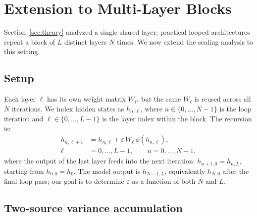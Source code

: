 \section{Extension to Multi-Layer Blocks}
\label{sec:multilayer}





Section~\ref{sec:theory} analyzed a single shared layer; practical looped architectures repeat a block of $L$ distinct layers $N$ times.
We now extend the scaling analysis to this setting.

\subsection{Setup}

Each layer $\ell$ has its own weight matrix $W_\ell$, but the same $W_\ell$ is reused across all $N$ iterations.
We index hidden states as $h_{n,\ell}$, where $n\in\{0,\dots,N-1\}$ is the loop iteration and $\ell\in\{0,\dots,L-1\}$ is the layer index within the block.
The recursion is:
\begin{equation}
  \begin{aligned}
  h_{n,\ell+1}
  &= h_{n,\ell}+\varepsilon\, W_\ell\,\phi(h_{n,\ell}),\\
  \ell&=0,\dots,L-1,\qquad n=0,\dots,N-1,
  \end{aligned}
  \label{eq:Llayer-recursion}
\end{equation}
where the output of the last layer feeds into the next iteration: $h_{n+1,0} = h_{n,L}$, starting from $h_{0,0} = h_0$.
The model output is $h_{N-1,L}$, equivalently $h_{N,0}$ after the final loop pass; our goal is to determine $\varepsilon$ as a function of both $N$ and $L$.

\subsection{Two-source variance accumulation}

